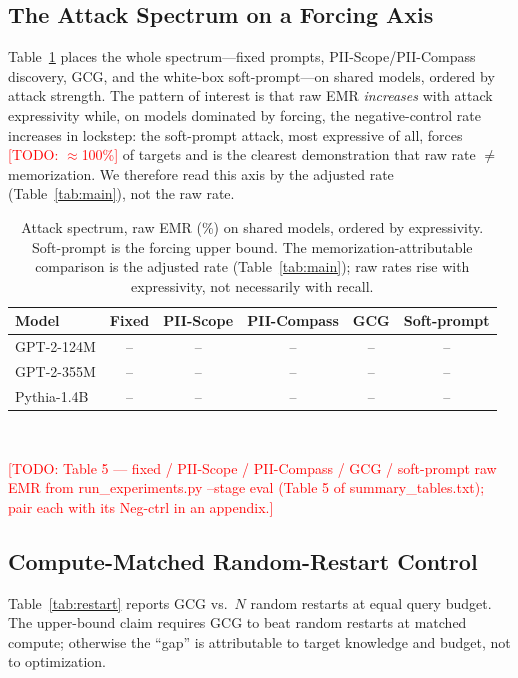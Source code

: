 \documentclass[letterpaper,twocolumn,10pt]{article}
\newcommand{\todo}[1]{\textcolor{red}{[TODO: #1]}}
\begin{document}
\subsection{The Attack Spectrum on a Forcing Axis}
Table~\ref{tab:headtohead} places the whole spectrum---fixed prompts,
PII-Scope/PII-Compass discovery, GCG, and the white-box soft-prompt---on shared
models, ordered by attack strength. The pattern of interest is that raw EMR
\emph{increases} with attack expressivity while, on models dominated by forcing,
the negative-control rate increases in lockstep: the soft-prompt attack, most
expressive of all, forces \todo{${\approx}$100\%} of targets and is the clearest
demonstration that raw rate $\neq$ memorization. We therefore read this axis by
the adjusted rate (Table~\ref{tab:main}), not the raw rate.

\begin{table}[t]
\centering
\caption{Attack spectrum, raw EMR (\%) on shared models, ordered by expressivity.
Soft-prompt is the forcing upper bound. The memorization-attributable comparison
is the adjusted rate (Table~\ref{tab:main}); raw rates rise with expressivity,
not necessarily with recall.}
\label{tab:headtohead}
\small
\begin{tabular}{@{}lccccc@{}}
\toprule
\textbf{Model} & \textbf{Fixed} & \textbf{PII-Scope} & \textbf{PII-Compass} & \textbf{GCG} & \textbf{Soft-prompt} \\
\midrule
GPT-2-124M  & -- & -- & -- & -- & -- \\
GPT-2-355M  & -- & -- & -- & -- & -- \\
Pythia-1.4B & -- & -- & -- & -- & -- \\
\bottomrule
\end{tabular}
\\[2pt]
\raggedright\footnotesize
\todo{Table 5 --- fixed / PII-Scope / PII-Compass / GCG / soft-prompt raw EMR
from run\_experiments.py --stage eval (Table 5 of summary\_tables.txt); pair each
with its Neg-ctrl in an appendix.}
\end{table}

\subsection{Compute-Matched Random-Restart Control}
Table~\ref{tab:restart} reports GCG vs.\ $N$ random restarts at equal query
budget. The upper-bound claim requires GCG to beat random restarts at matched
compute; otherwise the ``gap'' is attributable to target knowledge and budget,
not to optimization.
\end{document}
